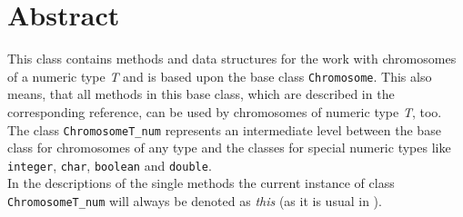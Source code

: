 \section{Abstract}

This class contains methods and data structures for the work
with chromosomes of a numeric type {\sl T} and
is based upon the base class {\tt Chromosome}.
This also means, that all methods in this base class, which are
described in the corresponding reference, can be used by
chromosomes of numeric type {\sl T}, too.
The class {\tt ChromosomeT\_num} represents an intermediate
level between the base class for chromosomes of any type and
the classes for special numeric types like {\tt integer}, {\tt char}, 
{\tt boolean} and {\tt double}.\\
In the descriptions of the single methods the current instance
of class\\ {\tt ChromosomeT\_num}
will always be denoted as {\em this} (as it is usual in \cpp).
